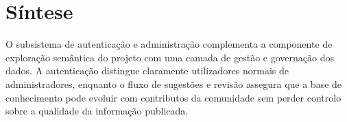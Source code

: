 \section{S\'intese}

O subsistema de autentica\c{c}\~ao e administra\c{c}\~ao complementa a componente de explora\c{c}\~ao sem\^antica do projeto com uma camada de gest\~ao e governa\c{c}\~ao dos dados. A autentica\c{c}\~ao distingue claramente utilizadores normais de administradores, enquanto o fluxo de sugest\~oes e revis\~ao assegura que a base de conhecimento pode evoluir com contributos da comunidade sem perder controlo sobre a qualidade da informa\c{c}\~ao publicada.
